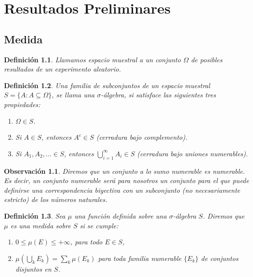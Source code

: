 \documentclass{report}
\newtheorem{dfn}{Definición}[section]
\newtheorem{obs}{Observación}[section]
\begin{document}
\tableofcontents
\chapter{Resultados Preliminares}
\section{Medida}

\begin{dfn}
    Llamamos \textit{espacio muestral} a un conjunto $\Omega$ de posibles resultados de un experimento aleatorio.
\end{dfn}
\begin{dfn}
Una familia de subconjuntos de un espacio muestral $S=\{A: A\subseteq\Omega\}$,  se llama una $\sigma$-\emph{álgebra}, si satisface las siguientes tres propiedades:

\begin{enumerate}
    \item \( \Omega \in S \).
    \item Si \( A \in S \), entonces \( A^c \in S \) (cerradura bajo complemento).
    \item Si \( A_1, A_2, \ldots \in S \), entonces \( \bigcup_{i=1}^\infty A_i \in S \) (cerradura bajo uniones numerables).
\end{enumerate}
\end{dfn}

\begin{obs}
    Diremos que un conjunto a lo sumo numerable es numerable. Es decir, un conjunto numerable será para nosotros un conjunto
    para el que puede definirse una correspondencia biyectiva con un subconjunto (no necesariamente estricto) de los números naturales.
\end{obs}

\begin{dfn}
Sea \( \mu \) una función definida sobre una \(\sigma\)-álgebra \( S \). Diremos que \( \mu \) es una \textit{medida} sobre \( S \) si se cumple:

\begin{enumerate}
  \item \( 0 \leq \mu(E) \leq +\infty \), para todo \( E \in S \),
  \item \( \mu\left( \displaystyle\bigcup_k E_k \right) = \displaystyle\sum_k \mu(E_k) \) para toda familia numerable \( \{E_k\} \) de conjuntos disjuntos en \( S \).
\end{enumerate}
\end{dfn}
\end{document}
